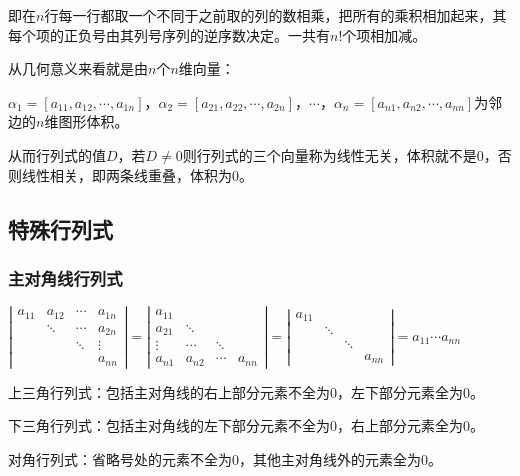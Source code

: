 \documentclass[UTF8, 12pt]{ctexart}
\begin{document}
    即在$n$行每一行都取一个不同于之前取的列的数相乘，把所有的乘积相加起来，其每个项的正负号由其列号序列的逆序数决定。一共有$n!$个项相加减。

    从几何意义来看就是由$n$个$n$维向量：

    $\alpha_1=[a_{11},a_{12},\cdots,a_{1n}]$，$\alpha_2=[a_{21},a_{22},\cdots,a_{2n}]$，$\cdots$，$\alpha_n=[a_{n1},a_{n2},\cdots,a_{nn}]$为邻边的$n$维图形体积。

    从而行列式的值$D$，若$D\neq0$则行列式的三个向量称为线性无关，体积就不是0，否则线性相关，即两条线重叠，体积为0。

    \subsection{特殊行列式}

    \subsubsection{主对角线行列式}

    $\left|\begin{array}{cccc}
               a_{11} & a_{12} & \cdots & a_{1n} \\
               & \ddots & \cdots & a_{2n} \\
               & & \ddots & \vdots  \\
               & & & a_{nn}
    \end{array}\right|=
    \left|\begin{array}{cccc}
              a_{11} & & & \\
              a_{21} & \ddots & & \\
              \vdots & \cdots & \ddots &  \\
              a_{n1} & a_{n2} & \cdots & a_{nn}
    \end{array}\right|=
    \left|\begin{array}{cccc}
              a_{11} & & & \\
              & \ddots & & \\
              & & \ddots &  \\
              & & & a_{nn}
    \end{array}\right|=a_{11}\cdots a_{nn}$

    上三角行列式：包括主对角线的右上部分元素不全为0，左下部分元素全为0。

    下三角行列式：包括主对角线的左下部分元素不全为0，右上部分元素全为0。

    对角行列式：省略号处的元素不全为0，其他主对角线外的元素全为0。
\end{document}
